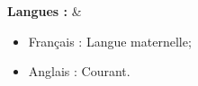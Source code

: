 \textbf{Langues :}
& \begin{itemize}
    \item Français : Langue maternelle;
    \item Anglais : Courant.
\end{itemize}